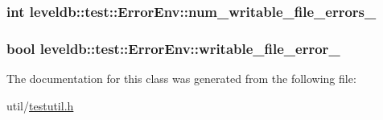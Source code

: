 \subsubsection[{num\+\_\+writable\+\_\+file\+\_\+errors\+\_\+}]{\setlength{\rightskip}{0pt plus 5cm}int leveldb\+::test\+::\+Error\+Env\+::num\+\_\+writable\+\_\+file\+\_\+errors\+\_\+}\label{classleveldb_1_1test_1_1_error_env_afa4564355d86107c8ed0d6efe53eadef}
\hypertarget{classleveldb_1_1test_1_1_error_env_ae3593b752dff671f24f3637376e1cf22}{}
\subsubsection[{writable\+\_\+file\+\_\+error\+\_\+}]{\setlength{\rightskip}{0pt plus 5cm}bool leveldb\+::test\+::\+Error\+Env\+::writable\+\_\+file\+\_\+error\+\_\+}\label{classleveldb_1_1test_1_1_error_env_ae3593b752dff671f24f3637376e1cf22}


The documentation for this class was generated from the following file\+:\begin{DoxyCompactItemize}
\item 
util/\hyperlink{testutil_8h}{testutil.\+h}\end{DoxyCompactItemize}
